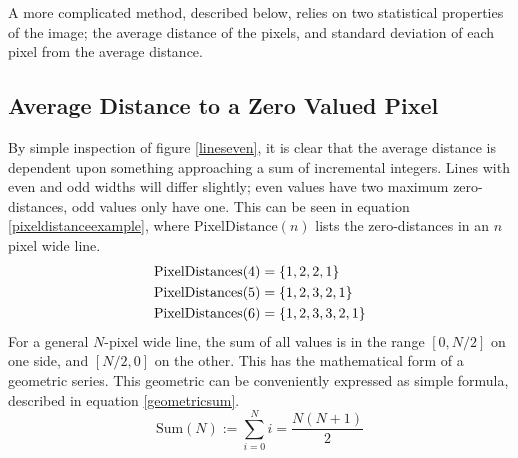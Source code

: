 \documentclass[../main.tex]{subfiles}
\begin{document}
  A more complicated method, described below, relies on two statistical properties of the image;
     the average distance of the pixels, and standard deviation of each pixel from the average distance.
  \subsection{Average Distance to a Zero Valued Pixel}
    By simple inspection of figure \ref{lineseven}, it is clear that the average distance is dependent upon something approaching a sum of incremental integers.
    Lines with even and odd widths will differ slightly; even values have two maximum zero-distances, odd values only have one.
    This can be seen in equation \ref{pixeldistanceexample}, where PixelDistance$(n)$ lists the zero-distances in an $n$ pixel wide line.
    \begin{align}
      \text{PixelDistances}(4) &= \{1,2,2,1\}\notag\\
      \text{PixelDistances}(5) &= \{1,2,3,2,1\}\notag\\
      \text{PixelDistances}(6) &= \{1,2,3,3,2,1\}
      \label{pixeldistanceexample}
    \end{align}
    For a general $N$-pixel wide line, the sum of all values is in the range $[0,N/2]$ on one side, and $[N/2,0]$ on the other.
    This has the mathematical form of a geometric series.
    This geometric can be conveniently expressed as simple formula, described in equation \ref{geometricsum}.
    \begin{equation}
      \text{Sum}(N):=\sum_{i=0}^{N} i = \frac{N(N+1)}{2}
      \label{geometricsum}
    \end{equation}
  
\end{document}
